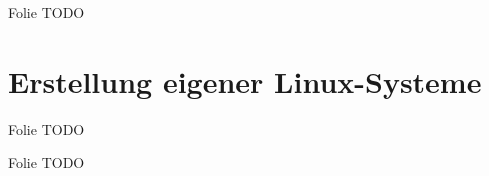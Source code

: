 \begin{frame}{Folie}
    TODO
\end{frame}

\section{Erstellung eigener Linux-Systeme}

\begin{frame}{Folie}
    TODO
\end{frame}

\begin{frame}{Folie}
    TODO
\end{frame}

